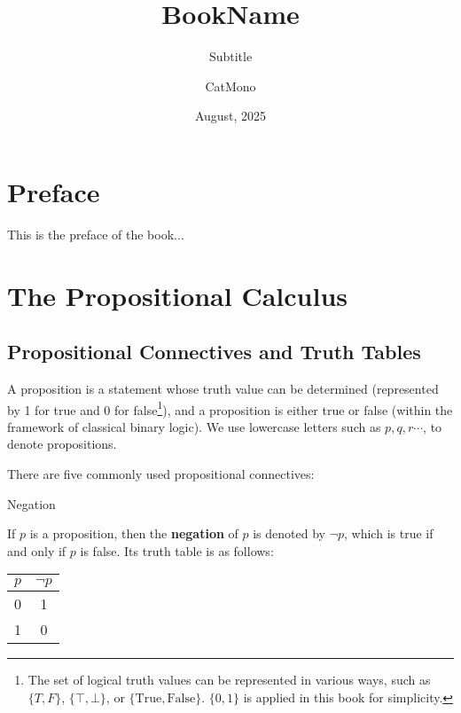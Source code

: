 \documentclass[11pt]{elegantbook}
\title{BookName} %
\subtitle{Subtitle} %
\author{CatMono} %
\date{August, 2025} %
\institute{Elegant\LaTeX{} Program} %
\begin{document}
\maketitle %

\frontmatter        %
\tableofcontents    %

\chapter{Preface}   %
This is the preface of the book...

\mainmatter         %

\chapter{The Propositional Calculus} %
\section{Propositional Connectives and Truth Tables} %
A proposition is a statement whose truth value can be determined 
(represented by 1 for true and 0 for false\footnote{
The set of logical truth values can be represented in various ways,
such as \(\{T, F\}\), \(\{\top, \bot\}\), or \(\{\text{True}, \text{False}\}\).
\(\{ 0,1 \}\) is applied in this book for simplicity.
}), 
and a proposition is either true or false (within the framework of classical binary logic). 
We use lowercase letters such as \(p,q,r\cdots\), to denote propositions.

There are five commonly used propositional connectives:
\begin{leftbarTitle}{Negation}\end{leftbarTitle}
If \(p\) is a proposition, then the \textbf{negation} of \(p\) is denoted by \(\neg p\), 
which is true if and only if \(p\) is false.
Its truth table is as follows:
\begin{center}
\begin{tabular}{cc}
\toprule
$p$ & $\neg p$ \\ %
\midrule
0 & 1  \\ %
1 & 0  \\ %
\bottomrule
\end{tabular}
\end{center}
\end{document}
